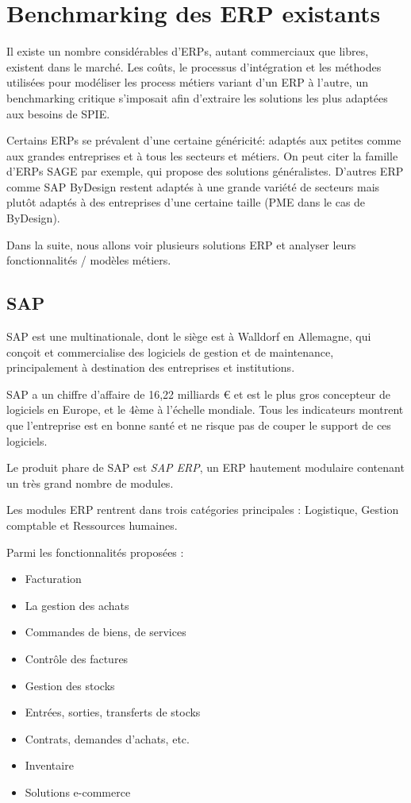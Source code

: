 \section{Benchmarking des ERP existants}

    Il existe un nombre considérables d'ERPs, autant commerciaux que libres, existent dans le marché. Les coûts, le processus d'intégration et les méthodes utilisées pour modéliser les process métiers variant d'un ERP à l'autre, un benchmarking critique s'imposait afin d'extraire les solutions les plus adaptées aux besoins de SPIE.

    Certains ERPs se prévalent d'une certaine généricité: adaptés aux petites comme aux grandes entreprises et à tous les secteurs et métiers. On peut citer la famille d'ERPs SAGE par exemple, qui propose des solutions généralistes. D'autres ERP comme SAP ByDesign restent adaptés à une grande variété de secteurs mais plutôt adaptés à des entreprises d'une certaine taille (PME dans le cas de ByDesign).

    Dans la suite, nous allons voir plusieurs solutions ERP et analyser leurs fonctionnalités / modèles métiers.

    \subsection{SAP}

        SAP est une multinationale, dont le siège est à Walldorf en Allemagne, qui conçoit et commercialise des logiciels de gestion et de maintenance, principalement à destination des entreprises et institutions.

        SAP a un chiffre d'affaire de 16,22 milliards € et est le plus gros concepteur de logiciels en Europe, et le 4ème à l'échelle mondiale. Tous les indicateurs montrent que l'entreprise est en bonne santé et ne risque pas de couper le support de ces logiciels.

        Le produit phare de SAP est \textit{SAP ERP}, un ERP hautement modulaire contenant un très grand nombre de modules.

        Les modules ERP rentrent dans trois catégories principales : Logistique, Gestion comptable et Ressources humaines.

        Parmi les fonctionnalités proposées :

        \begin{itemize}
            \item Facturation
            \item La gestion des achats
            \item Commandes de biens, de services
            \item Contrôle des factures
            \item Gestion des stocks
            \item Entrées, sorties, transferts de stocks
            \item Contrats, demandes d'achats, etc.
            \item Inventaire
            \item Solutions e-commerce
        \end{itemize}


